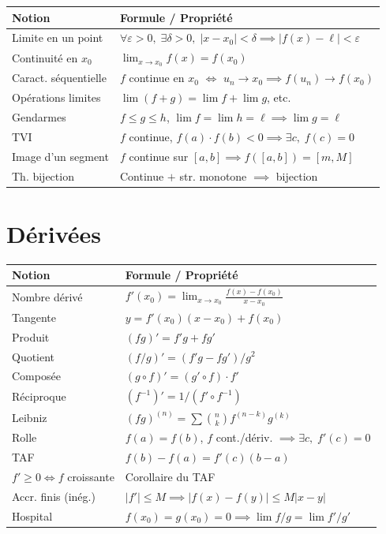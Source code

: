 \begin{center}
\renewcommand{\arraystretch}{1.4}
\begin{tabular}{|l|l|}
\hline
\textbf{Notion} & \textbf{Formule / Propriété} \\
\hline
Limite en un point & $\forall \varepsilon > 0, \; \exists \delta > 0, \; |x - x_0| < \delta \implies |f(x) - \ell| < \varepsilon$ \\
Continuité en $x_0$ & $\lim_{x \to x_0} f(x) = f(x_0)$ \\
Caract. séquentielle & $f$ continue en $x_0$ $\iff$ $u_n \to x_0 \implies f(u_n) \to f(x_0)$ \\
Opérations limites & $\lim(f+g) = \lim f + \lim g$, etc. \\
Gendarmes & $f \leqslant g \leqslant h$, $\lim f = \lim h = \ell \implies \lim g = \ell$ \\
TVI & $f$ continue, $f(a) \cdot f(b) < 0 \implies \exists c, \; f(c) = 0$ \\
Image d'un segment & $f$ continue sur $[a,b] \implies f([a,b]) = [m, M]$ \\
Th. bijection & Continue $+$ str. monotone $\implies$ bijection \\
\hline
\end{tabular}
\end{center}

\section{Dérivées}

\begin{center}
\renewcommand{\arraystretch}{1.4}
\begin{tabular}{|l|l|}
\hline
\textbf{Notion} & \textbf{Formule / Propriété} \\
\hline
Nombre dérivé & $f'(x_0) = \lim_{x \to x_0} \frac{f(x) - f(x_0)}{x - x_0}$ \\
Tangente & $y = f'(x_0)(x - x_0) + f(x_0)$ \\
Produit & $(fg)' = f'g + fg'$ \\
Quotient & $(f/g)' = (f'g - fg')/g^2$ \\
Composée & $(g \circ f)' = (g' \circ f) \cdot f'$ \\
Réciproque & $(f^{-1})' = 1/(f' \circ f^{-1})$ \\
Leibniz & $(fg)^{(n)} = \sum \binom{n}{k} f^{(n-k)} g^{(k)}$ \\
Rolle & $f(a) = f(b)$, $f$ cont./dériv. $\implies \exists c, \; f'(c) = 0$ \\
TAF & $f(b) - f(a) = f'(c)(b-a)$ \\
$f' \geqslant 0 \iff f$ croissante & Corollaire du TAF \\
Accr. finis (inég.) & $|f'| \leqslant M \implies |f(x) - f(y)| \leqslant M|x-y|$ \\
Hospital & $f(x_0) = g(x_0) = 0 \implies \lim f/g = \lim f'/g'$ \\
\hline
\end{tabular}
\end{center}


